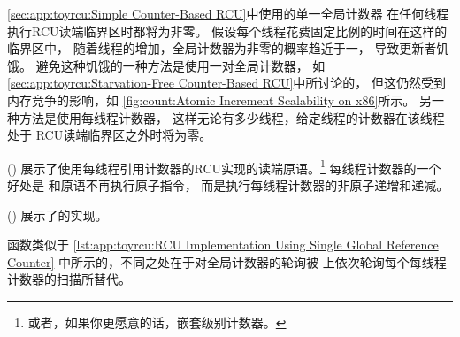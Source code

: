 \cref{sec:app:toyrcu:Simple Counter-Based RCU}中使用的单一全局计数器
在任何线程执行RCU读端临界区时都将为非零。
假设每个线程花费固定比例的时间在这样的临界区中，
随着线程的增加，全局计数器为非零的概率趋近于一，
导致更新者饥饿。
避免这种饥饿的一种方法是使用一对全局计数器，
如\cref{sec:app:toyrcu:Starvation-Free Counter-Based RCU}中所讨论的，
但这仍然受到内存竞争的影响，如
\cref{fig:count:Atomic Increment Scalability on x86}所示。
另一种方法是使用每线程计数器，
这样无论有多少线程，给定线程的计数器在该线程处于
RCU读端临界区之外时将为零。

()
展示了使用每线程引用计数器的RCU实现的读端原语。\footnote{
	或者，如果你更愿意的话，嵌套级别计数器。}
每线程计数器的一个好处是
和原语不再执行原子指令，
而是执行每线程计数器的非原子递增和递减。

\begin{listing}

\caption{RCU每线程引用计数数据}
\label{lst:app:toyrcu:RCU Per-Thread Reference-Count Data}
\end{listing}

\begin{listing}

\caption{使用每线程引用计数的RCU读端}
\label{lst:app:toyrcu:RCU Read-Side Using Per-Thread Reference-Count}
\end{listing}

\QuickQuizEnd

\begin{listing}

\caption{使用每线程引用计数的RCU更新}
\label{lst:app:toyrcu:RCU Update Using Per-Thread Reference-Count}
\end{listing}

()
展示了的实现。
\begin{fcvref}
函数类似于
\cref{lst:app:toyrcu:RCU Implementation Using Single Global Reference Counter}
中所示的，不同之处在于对全局计数器的轮询被
上依次轮询每个每线程计数器的扫描所替代。
\end{fcvref}


